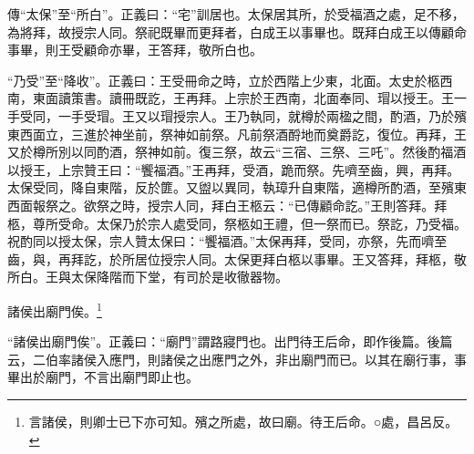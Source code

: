 {\noindent\zhuan{}\fzbyks 傳“太保”至“所白”。正義曰：“宅”訓居也。太保居其所，於受福酒之處，足不移，為將拜，故授宗人同。祭祀既畢而更拜者，白成王以事畢也。既拜白成王以傳顧命事畢，則王受顧命亦畢，王答拜，敬所白也。 \par}

{\noindent\shu{}\fzkt “乃受”至“降收”。正義曰：王受冊命之時，立於西階上少東，北面。太史於柩西南，東面讀策書。讀冊既訖，王再拜。上宗於王西南，北面奉同、瑁以授王。王一手受同，一手受瑁。王又以瑁授宗人。王乃執同，就樽於兩楹之間，酌酒，乃於殯東西面立，三進於神坐前，祭神如前祭。凡前祭酒酹地而奠爵訖，復位。再拜，王又於樽所別以同酌酒，祭神如前。復三祭，故云“三宿、三祭、三吒”。然後酌福酒以授王，上宗贊王曰：“饗福酒。”王再拜，受酒，跪而祭。先嚌至齒，興，再拜。太保受同，降自東階，反於篚。又盥以異同，執璋升自東階，適樽所酌酒，至殯東西面報祭之。欲祭之時，授宗人同，拜白王柩云：“已傳顧命訖。”王則答拜。拜柩，尊所受命。太保乃於宗人處受同，祭柩如王禮，但一祭而已。祭訖，乃受福。祝酌同以授太保，宗人贊太保曰：“饗福酒。”太保再拜，受同，亦祭，先而嚌至齒，與，再拜訖，於所居位授宗人同。太保更拜白柩以事畢。王又答拜，拜柩，敬所白。王與太保降階而下堂，有司於是收徹器物。 \par}

諸侯出廟門俟。\footnote{言諸侯，則卿士已下亦可知。殯之所處，故曰廟。待王后命。○處，昌呂反。}

{\noindent\shu{}\fzkt “諸侯出廟門俟”。正義曰：“廟門”謂路寢門也。出門待王后命，即作後篇。後篇云，二伯率諸侯入應門，則諸侯之出應門之外，非出廟門而已。以其在廟行事，事畢出於廟門，不言出廟門即止也。 \par}


